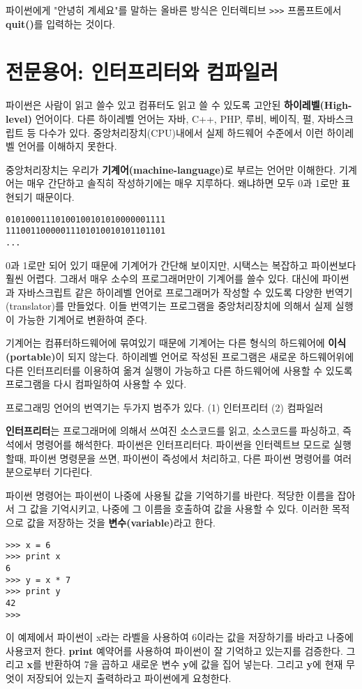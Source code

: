 파이썬에게 "안녕히 계세요"를 말하는 올바른 방식은 인터렉티브 {\tt >>>} 프롬프트에서 {\bf quit()}를 입력하는 것이다.



\section{전문용어: 인터프리터와 컴파일러}
파이썬은 사람이 읽고 쓸수 있고 컴퓨터도 읽고 쓸 수 있도록 고안된 {\bf 하이레벨(High-level)} 언어이다. 다른 하이레벨 언어는 자바, C++, PHP, 루비, 베이직, 펄, 자바스크립트 등 다수가 있다. 중앙처리장치(CPU)내에서 실제 하드웨어 수준에서 이런 하이레벨 언어를 이해하지 못한다.

중앙처리장치는 우리가 {\bf 기계어(machine-language)}로 부르는 언어만 이해한다. 기계어는 매우 간단하고 솔직히 작성하기에는 매우 지루하다. 왜냐하면 모두 0과 1로만 표현되기 때문이다.

\beforeverb
\begin{verbatim}
01010001110100100101010000001111
11100110000011101010010101101101
...
\end{verbatim}
\afterverb
%
0과 1로만 되어 있기 때문에 기계어가 간단해 보이지만, 시택스는 복잡하고 파이썬보다 훨씬 어렵다. 그래서 매우 소수의 프로그래머만이 기계어를 쓸수 있다. 대신에 파이썬과 자바스크립트 같은 하이레벨 언어로 프로그래머가 작성할 수 있도록 다양한 번역기(translator)를 만들었다. 이들 번역기는 프로그램을 중앙처리장치에 의해서 실제 실행이 가능한 기계어로 변환하여 준다.

기계어는 컴퓨터하드웨어에 묶여있기 때문에 기계어는 다른 형식의 하드웨어에 {\bf 이식(portable)}이 되지 않는다. 하이레벨 언어로 작성된 프로그램은 새로운 하드웨어위에 다른 인터프리터를 이용하여 옮겨 실행이 가능하고 다른 하드웨어에 사용할 수 있도록 프로그램을 다시 컴파일하여 사용할 수 있다.

프로그래밍 언어의 번역기는 두가지 범주가 있다. 
(1) 인터프리터 (2) 컴파일러

{\bf 인터프리터}는 프로그래머에 의해서 쓰여진 소스코드를 읽고, 소스코드를 파싱하고, 즉석에서 명령어를 해석한다. 파이썬은 인터프리터다. 파이썬을 인터렉트브 모드로 실행할때, 파이썬 명령문을 쓰면, 파이썬이 즉성에서 처리하고, 다른 파이썬 명령어를 여러분으로부터 기다린다.

파이썬 명령어는 파이썬이 나중에 사용될 값을 기억하기를 바란다. 적당한 이름을 잡아서 그 값을 기억시키고, 나중에 그 이름을 호출하여 값을 사용할 수 있다. 이러한 목적으로 값을 저장하는 것을 {\bf 변수(variable)}라고 한다.

\beforeverb
\begin{verbatim}
>>> x = 6
>>> print x
6
>>> y = x * 7
>>> print y
42
>>> 
\end{verbatim}
\afterverb
%
이 예제에서 파이썬이 x라는 라벨을 사용하여 6이라는 값을 저장하기를 바라고 나중에 사용코저 한다. {\bf print} 예약어를 사용하여 파이썬이 잘 기억하고 있는지를 검증한다. 그리고 {\bf x}를 반환하여 7을 곱하고 새로운 변수 {\bf y}에 값을 집어 넣는다. 그리고 {\bf y}에 현재 무엇이 저장되어 있는지 출력하라고 파이썬에게 요청한다.

